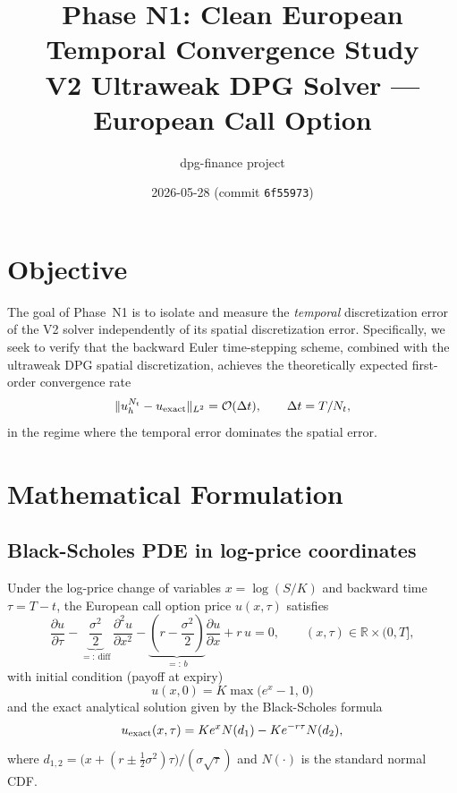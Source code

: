 \documentclass[11pt,a4paper]{article}
\title{\textbf{Phase N1: Clean European Temporal Convergence Study}\\
       \large V2 Ultraweak DPG Solver — European Call Option}
\author{dpg-finance project}
\date{2026-05-28 \quad (commit \texttt{6f55973})}
\newcommand{\Nt}{N_t}
\newcommand{\dt}{\Delta t}
\newcommand{\bigo}[1]{\mathcal{O}(#1)}
\begin{document}
\maketitle
\tableofcontents
\bigskip

\section{Objective}

The goal of Phase~N1 is to isolate and measure the \emph{temporal}
discretization error of the V2 solver independently of its spatial
discretization error.  Specifically, we seek to verify that the
backward Euler time-stepping scheme, combined with the ultraweak DPG
spatial discretization, achieves the theoretically expected
first-order convergence rate
\[
  \|u_h^{N_t} - u_{\rm exact}\|_{L^2} = \bigo{\dt}, \qquad \dt = T/\Nt,
\]
in the regime where the temporal error dominates the spatial error.

\section{Mathematical Formulation}

\subsection{Black-Scholes PDE in log-price coordinates}

Under the log-price change of variables $x = \log(S/K)$ and
backward time $\tau = T - t$, the European call option price
$u(x,\tau)$ satisfies
\begin{equation}\label{eq:bs-pde}
  \frac{\partial u}{\partial \tau}
  - \underbrace{\frac{\sigma^2}{2}}_{=:\,\mathrm{diff}}\,
    \frac{\partial^2 u}{\partial x^2}
  - \underbrace{\!\left(r - \frac{\sigma^2}{2}\right)}_{=:\,b}\!
    \frac{\partial u}{\partial x}
  + r\,u = 0,
  \qquad (x,\tau)\in\mathbb{R}\times(0,T],
\end{equation}
with initial condition (payoff at expiry)
\[
  u(x,0) = K\max\!\bigl(e^x - 1,\,0\bigr)
\]
and the exact analytical solution given by the Black-Scholes formula
\[
  u_{\rm exact}(x,\tau)
    = K e^x N(d_1) - K e^{-r\tau} N(d_2),
\]
where $d_{1,2} = \bigl(x + (r \pm \tfrac{1}{2}\sigma^2)\tau\bigr)
/ (\sigma\sqrt{\tau})$ and $N(\cdot)$ is the standard normal CDF.
\end{document}
